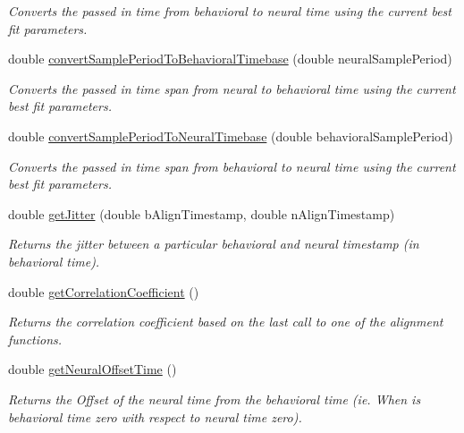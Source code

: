 \begin{DoxyCompactItemize}
\begin{DoxyCompactList}\small\item\em Converts the passed in time from behavioral to neural time using the current best fit parameters. \end{DoxyCompactList}\item 
double \hyperlink{class_alignment_tool_a43752b711ae350128598c28026b4c698}{convert\-Sample\-Period\-To\-Behavioral\-Timebase} (double neural\-Sample\-Period)
\begin{DoxyCompactList}\small\item\em Converts the passed in time span from neural to behavioral time using the current best fit parameters. \end{DoxyCompactList}\item 
double \hyperlink{class_alignment_tool_ae34b218ef3e8558d03d679251a935b00}{convert\-Sample\-Period\-To\-Neural\-Timebase} (double behavioral\-Sample\-Period)
\begin{DoxyCompactList}\small\item\em Converts the passed in time span from behavioral to neural time using the current best fit parameters. \end{DoxyCompactList}\item 
double \hyperlink{class_alignment_tool_a7fbe9b7c8ff096353a292a0da819b3d4}{get\-Jitter} (double b\-Align\-Timestamp, double n\-Align\-Timestamp)
\begin{DoxyCompactList}\small\item\em Returns the jitter between a particular behavioral and neural timestamp (in behavioral time). \end{DoxyCompactList}\item 
double \hyperlink{class_alignment_tool_abd817b37d22c620c71897b1aff2f7d6a}{get\-Correlation\-Coefficient} ()
\begin{DoxyCompactList}\small\item\em Returns the correlation coefficient based on the last call to one of the alignment functions. \end{DoxyCompactList}\item 
double \hyperlink{class_alignment_tool_a347b17cf64237bfcabbef4d3127980da}{get\-Neural\-Offset\-Time} ()
\begin{DoxyCompactList}\small\item\em Returns the Offset of the neural time from the behavioral time (ie. When is behavioral time zero with respect to neural time zero). \end{DoxyCompactList}\item 

\end{DoxyCompactItemize}
